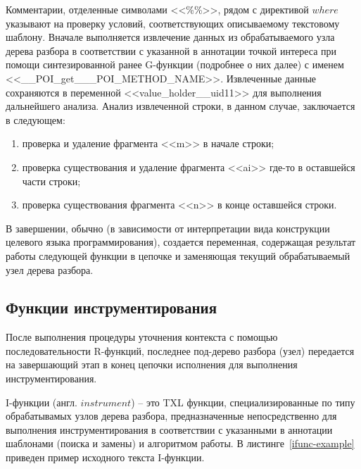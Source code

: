 Комментарии, отделенные символами <<\%\%>>, рядом с директивой $where$ указывают на проверку условий, соответствующих описываемому текстовому шаблону.
Вначале выполняется извлечение данных из обрабатываемого узла дерева разбора в соответствии с указанной в аннотации точкой интереса при помощи синтезированной ранее G-функции (подробнее о них далее) с именем <<\_\_POI\_get\_\_\_POI\_METHOD\_NAME>>.
Извлеченные данные сохраняются в переменной <<value\_holder\_\_uid11>> для выполнения дальнейшего анализа.
Анализ извлеченной строки, в данном случае, заключается в следующем:

\begin{enumerate}[noitemsep]
  \item проверка и удаление фрагмента <<m>> в начале строки;
  \item проверка существования и удаление фрагмента <<ai>> где-то в оставшейся части строки;
  \item проверка существования фрагмента <<n>> в конце оставшейся строки.
\end{enumerate}

В завершении, обычно (в зависимости от интерпретации вида конструкции целевого языка программирования), создается переменная, содержащая результат работы следующей функции в цепочке и заменяющая текущий обрабатываемый узел дерева разбора.

\subsection{Функции инструментирования}

После выполнения процедуры уточнения контекста с помощью последовательности R-функций, последнее под-дерево разбора (узел) передается на завершающий этап в конец цепочки исполнения для выполнения инструментирования.

I-функции (англ. $instrument$) -- это TXL функции, специализированные по типу обрабатывамых узлов дерева разбора, предназначенные непосредственно для выполнения инструментирования в соответствии с указанными в аннотации шаблонами (поиска и замены) и алгоритмом работы.
В листинге~\ref{ifunc-example} приведен пример исходного текста I-функции.


